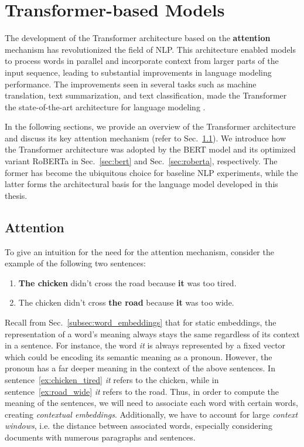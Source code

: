 \section{Transformer-based Models} \label{sec:transformers}

The development of the Transformer architecture based on the \textbf{attention}
mechanism has revolutionized the field of NLP. This architecture enabled models
to process words in parallel and incorporate context from larger parts of the
input sequence, leading to substantial improvements in language modeling
performance. The improvements seen in several tasks such as machine translation,
text summarization, and text classification, made the Transformer the
state-of-the-art architecture for language modeling \cite{wolf2020transformers}.

In the following sections, we provide an overview of the Transformer
architecture and discuss its key attention mechanism (refer to
Sec.~\ref{sec:attention}). We introduce how the Transformer architecture was
adopted by the BERT model and its optimized variant RoBERTa in
Sec.~\ref{sec:bert} and Sec.~\ref{sec:roberta}, respectively. The former has
become the ubiquitous choice for baseline NLP experiments, while the latter
forms the architectural basis for the language model developed in this thesis.

\subsection{Attention} \label{sec:attention}

To give an intuition for the need for the attention mechanism, consider the
example of the following two sentences:

\begin{enumerate}
    \item \textbf{The chicken} didn’t cross the road because \textbf{it} was too
    tired. \label{ex:chicken_tired}
    \item The chicken didn’t cross \textbf{the road} because \textbf{it} was too
    wide.
    \label{ex:road_wide}
\end{enumerate}

Recall from Sec.~\ref{subsec:word_embeddings} that for static embeddings, the
representation of a word's meaning always stays the same regardless of its
context in a sentence. For instance, the word \textit{it} is always represented
by a fixed vector which could be encoding its semantic meaning as a pronoun.
However, the pronoun has a far deeper meaning in the context of the above
sentences. In sentence~\ref{ex:chicken_tired} \textit{it} refers to the chicken,
while in sentence~\ref{ex:road_wide} \textit{it} refers to the road. Thus, in
order to compute the meaning of the sentences, we will need to associate each
word with certain words, creating \textit{contextual embeddings}. Additionally,
we have to account for large \textit{context windows}, i.e. the distance between
associated words, especially considering documents with numerous paragraphs and
sentences.

